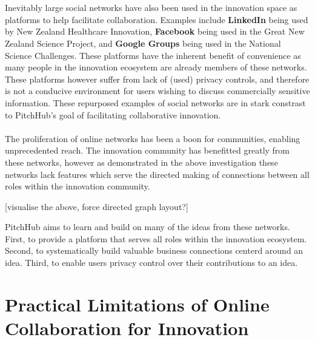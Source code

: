 \\
\\
Inevitably large social networks have also been used in the innovation space as platforms to help facilitate collaboration. Examples include \textbf{LinkedIn} being used by New Zealand Healthcare Innovation, \textbf{Facebook} being used in the Great New Zealand Science Project, and \textbf{Google Groups} being used in the National Science Challenges. These platforms have the inherent benefit of convenience as many people in the innovation ecosystem are already members of these networks. These platforms however suffer from lack of (used) privacy controls, and therefore is not a conducive environment for users wishing to discuss commercially sensitive information. These repurposed examples of social networks are in stark constrast to PitchHub's goal of facilitating collaborative innovation.
\\
\\
The proliferation of online networks has been a boon for communities, enabling unprecedented reach. The innovation community has benefitted greatly from these networks, however as demonstrated in the above investigation these networks lack features which serve the directed making of connections between all roles within the innovation community.

[visualise the above, force directed graph layout?]

PitchHub aims to learn and build on many of the ideas from these networks. First, to provide a platform that serves all roles within the innovation ecosystem. Second, to systematically build valuable business connections centerd around an idea. Third, to enable users privacy control over their contributions to an idea.

\section{Practical Limitations of Online Collaboration for Innovation}